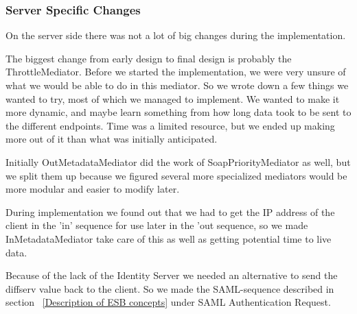 \subsubsection{Server Specific Changes}\label{Changes:Server}
    On the server side there was not a lot of big changes during the implementation.
    
    The biggest change from early design to final design is probably the ThrottleMediator. Before we started the implementation, we were very unsure of what we would be able to do in this mediator. So we wrote down a few things we wanted to try, most of which we managed to implement. We wanted to make it more dynamic, and maybe learn something from how long data took to be sent to the different endpoints. Time was a limited resource, but we ended up making more out of it than what was initially anticipated.

    Initially OutMetadataMediator did the work of SoapPriorityMediator as well, but we split them up because we figured several more specialized mediators would be more modular and easier to modify later.

    During implementation we found out that we had to get the IP address of the client in the 'in' sequence for use later in the 'out sequence, so we made InMetadataMediator take care of this as well as getting potential time to live data.

    Because of the lack of the Identity Server we needed an alternative to send the diffserv value back to the client. So we made the SAML-sequence described in section ~\ref{Description of ESB concepts} under SAML Authentication Request.